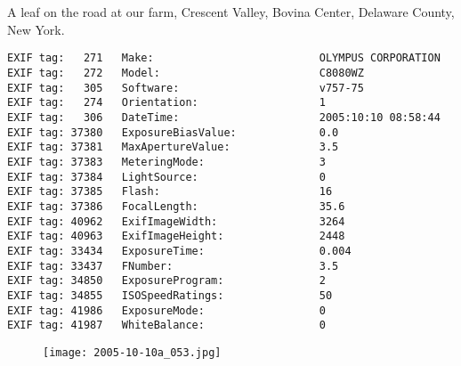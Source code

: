 \section{\protect{}}
\noindent A leaf on the road at our farm, Crescent Valley, Bovina Center, Delaware County, New York.
\noindent
\begin{lstlisting}
EXIF tag:   271   Make:                          OLYMPUS CORPORATION
EXIF tag:   272   Model:                         C8080WZ
EXIF tag:   305   Software:                      v757-75
EXIF tag:   274   Orientation:                   1
EXIF tag:   306   DateTime:                      2005:10:10 08:58:44
EXIF tag: 37380   ExposureBiasValue:             0.0
EXIF tag: 37381   MaxApertureValue:              3.5
EXIF tag: 37383   MeteringMode:                  3
EXIF tag: 37384   LightSource:                   0
EXIF tag: 37385   Flash:                         16
EXIF tag: 37386   FocalLength:                   35.6
EXIF tag: 40962   ExifImageWidth:                3264
EXIF tag: 40963   ExifImageHeight:               2448
EXIF tag: 33434   ExposureTime:                  0.004
EXIF tag: 33437   FNumber:                       3.5
EXIF tag: 34850   ExposureProgram:               2
EXIF tag: 34855   ISOSpeedRatings:               50
EXIF tag: 41986   ExposureMode:                  0
EXIF tag: 41987   WhiteBalance:                  0

\end{lstlisting}
\clearpage
\begin{figure}
\raggedleft
\texttt{[image: 2005-10-10a\_053.jpg]}
\end{figure}


\clearpage
